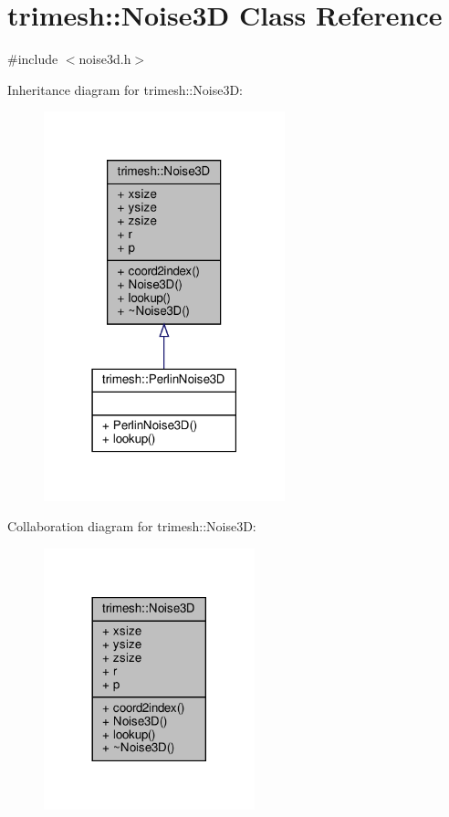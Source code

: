 \hypertarget{classtrimesh_1_1Noise3D}{}\section{trimesh\+:\+:Noise3D Class Reference}
\label{classtrimesh_1_1Noise3D}


{\ttfamily \#include $<$noise3d.\+h$>$}



Inheritance diagram for trimesh\+:\+:Noise3D\+:\nopagebreak
\begin{figure}[H]
\begin{center}
\leavevmode
\includegraphics[width=198pt]{d9/dec/classtrimesh_1_1Noise3D__inherit__graph}
\end{center}
\end{figure}


Collaboration diagram for trimesh\+:\+:Noise3D\+:\nopagebreak
\begin{figure}[H]
\begin{center}
\leavevmode
\includegraphics[width=173pt]{d4/df1/classtrimesh_1_1Noise3D__coll__graph}
\end{center}
\end{figure}
